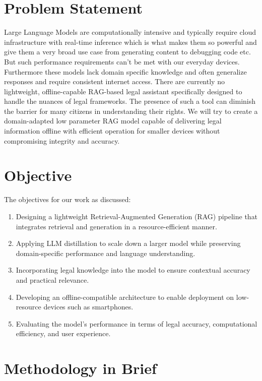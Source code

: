 \section{Problem Statement}


Large Language Models are computationally intensive and typically require cloud infrastructure with real-time inference which is what makes them so powerful and give them a very broad use case from generating content to debugging code etc. But such performance requirements can't be met  with our everyday devices. Furthermore these models lack domain specific knowledge and often generalize responses and require consistent internet access. There are currently no lightweight, offline-capable RAG-based legal assistant specifically designed to handle the nuances of legal frameworks. The presence of such a tool can diminish the barrier for many citizens in understanding their rights. We will try to create a domain-adapted low parameter RAG model capable of delivering legal information offline with efficient operation for smaller devices without compromising integrity and accuracy. 


\section{Objective}

The objectives for our work as discussed: 
\begin{enumerate}
    \item Designing a lightweight Retrieval-Augmented Generation (RAG) pipeline that integrates retrieval and generation in a resource-efficient manner.
    \item Applying LLM distillation to scale down a larger model while preserving domain-specific performance and language understanding.
    \item Incorporating legal knowledge into the model to ensure contextual accuracy and practical relevance.
    \item Developing an offline-compatible architecture to enable deployment on low-resource devices such as smartphones.
    \item Evaluating the model's performance in terms of legal accuracy, computational efficiency, and user experience.
\end{enumerate}

\section{Methodology in Brief }


